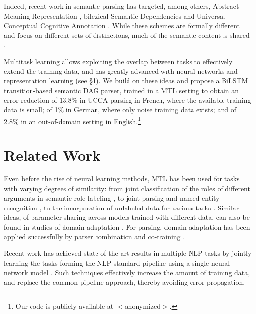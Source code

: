\documentclass[11pt,a4paper]{article}
\begin{document}
Indeed, recent work in semantic parsing has targeted, among others,
Abstract Meaning Representation \cite[AMR;][]{banarescu2013abstract,damonte-17,Buys2017RobustIN},
bilexical Semantic Dependencies \cite[SDP;][]{oepen2014semeval,oepen2015semeval,oepen2016towards,P17-1186}
and Universal Conceptual Cognitive Annotation \cite[UCCA;][]{abend2013universal,hershcovich2017a}.
While these schemes are formally different and focus on different sets of distinctions,
much of the semantic content is shared \cite{abend2017state}.

Multitask learning \cite[MTL; ][]{caruana1998multitask} allows exploiting the overlap between tasks
to effectively extend the training data,
and has greatly advanced with neural networks and representation learning
(see \S\ref{sec:related_work}).
We build on these ideas and propose a BiLSTM transition-based semantic DAG parser,
trained in a MTL setting to obtain an error reduction of 13.8\% in UCCA parsing
in French, where the available training data is small;
of 1\% in German, where only noise training data exists;
and of 2.8\% in an out-of-domain setting in
English.\footnote{Our code is publicly available at $<$anonymized$>$.}



\section{Related Work}\label{sec:related_work}
Even before the rise of neural learning methods,
MTL has been used for tasks with varying degrees of similarity:
from joint classification of the roles of different arguments in semantic role labeling \cite{toutanova2005joint},
to joint parsing and named entity recognition \cite{Finkel2009JointPA},
to the incorporation of unlabeled data for various tasks \cite{ando2005framework}.
Similar ideas, of parameter sharing across models trained with different data,
can also be found in studies of domain adaptation \cite{W06-1615,P07-1033,K17-1040}.
For parsing, domain adaptation has been applied successfully by
parser combination and co-training \cite{mcclosky2010automatic,baucom2013domain}.

Recent work has achieved state-of-the-art results in multiple NLP tasks
by jointly learning the tasks forming the NLP standard pipeline using 
a single neural network model \cite{collobert2011natural,D17-1206}.
Such techniques effectively increase the amount of training data,
and replace the common pipeline approach, thereby avoiding error propagation.
\end{document}
